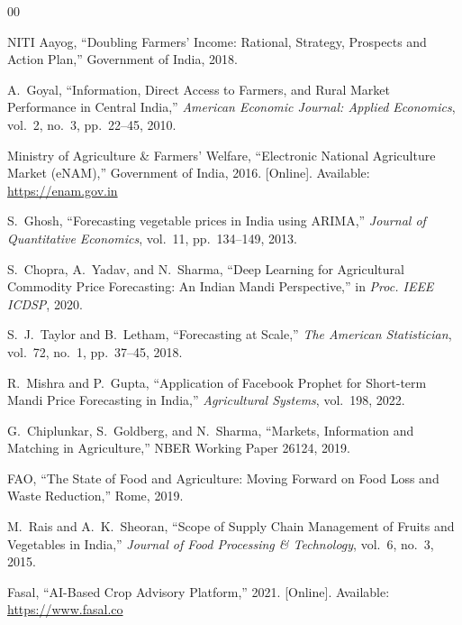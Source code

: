 \documentclass[conference]{IEEEtran}
\begin{document}
\begin{thebibliography}{00}

NITI Aayog, ``Doubling Farmers' Income: Rational, Strategy, Prospects and Action Plan,'' Government of India, 2018.

A.~Goyal, ``Information, Direct Access to Farmers, and Rural Market Performance in Central India,'' \textit{American Economic Journal: Applied Economics}, vol.~2, no.~3, pp.~22–45, 2010.

Ministry of Agriculture \& Farmers' Welfare, ``Electronic National Agriculture Market (eNAM),'' Government of India, 2016. [Online]. Available: \url{https://enam.gov.in}

S.~Ghosh, ``Forecasting vegetable prices in India using ARIMA,'' \textit{Journal of Quantitative Economics}, vol.~11, pp.~134–149, 2013.

S.~Chopra, A.~Yadav, and N.~Sharma, ``Deep Learning for Agricultural Commodity Price Forecasting: An Indian Mandi Perspective,'' in \textit{Proc. IEEE ICDSP}, 2020.

S.~J.~Taylor and B.~Letham, ``Forecasting at Scale,'' \textit{The American Statistician}, vol.~72, no.~1, pp.~37–45, 2018.

R.~Mishra and P.~Gupta, ``Application of Facebook Prophet for Short-term Mandi Price Forecasting in India,'' \textit{Agricultural Systems}, vol.~198, 2022.

G.~Chiplunkar, S.~Goldberg, and N.~Sharma, ``Markets, Information and Matching in Agriculture,'' NBER Working Paper 26124, 2019.

FAO, ``The State of Food and Agriculture: Moving Forward on Food Loss and Waste Reduction,'' Rome, 2019.

M.~Rais and A.~K.~Sheoran, ``Scope of Supply Chain Management of Fruits and Vegetables in India,'' \textit{Journal of Food Processing \& Technology}, vol.~6, no.~3, 2015.

Fasal, ``AI-Based Crop Advisory Platform,'' 2021. [Online]. Available: \url{https://www.fasal.co}

\end{thebibliography}
\end{document}
